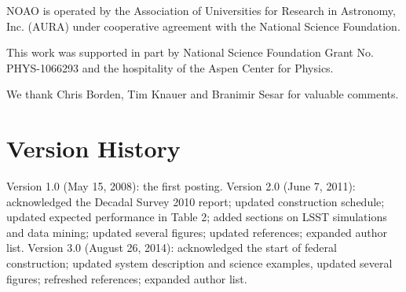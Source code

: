 \documentclass[twocolumn]{aastex61}
\begin{document}
NOAO is operated by the Association of Universities for Research in Astronomy,
Inc. (AURA) under cooperative agreement with the National Science Foundation.

This work was supported in part by National Science Foundation Grant No. PHYS-1066293
and the hospitality of the Aspen Center for Physics.

We thank Chris Borden, Tim Knauer and Branimir Sesar for valuable comments.


\appendix
\section{Version History}

\vskip 0.06in
Version 1.0 (May 15, 2008): the first posting.
\vskip 0.06in
Version 2.0 (June 7, 2011): acknowledged the Decadal Survey 2010 report; updated construction schedule;
updated expected performance in Table 2; added sections on LSST simulations and data mining;
updated several figures; updated references; expanded author list.
\vskip 0.06in
Version 3.0 (August 26, 2014): acknowledged the start of federal construction;
updated system description and science examples, updated several figures; refreshed references;
expanded author list.
\end{document}
